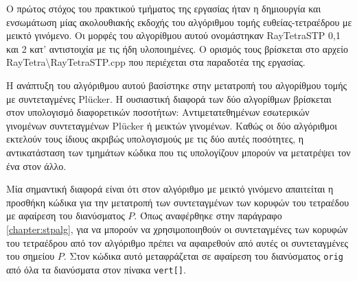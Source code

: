 \noindent Ο πρώτος στόχος του πρακτικού τμήματος της εργασίας ήταν η δημιουργία και ενσωμάτωση μίας ακολουθιακής εκδοχής του αλγόριθμου τομής ευθείας-τετραέδρου με μεικτό γινόμενο. Οι μορφές του αλγορίθμου αυτού ονομάστηκαν RayTetraSTP 0,1 και 2 κατ' αντιστοιχία με τις ήδη υλοποιημένες. Ο ορισμός τους βρίσκεται στο αρχείο RayTetra\textbackslash RayTetraSTP.cpp που περιέχεται στα παραδοτέα της εργασίας.

Η ανάπτυξη του αλγόριθμου αυτού βασίστηκε στην μετατροπή του αλγορίθμου τομής με συντεταγμένες Plücker. Η ουσιαστική διαφορά των δύο αλγορίθμων βρίσκεται στον υπολογισμό διαφορετικών ποσοτήτων: Αντιμετατεθημένων εσωτερικών γινομένων συντεταγμένων Plücker ή μεικτών γινομένων. Καθώς οι δύο αλγόριθμοι εκτελούν τους ίδιους ακριβώς υπολογισμούς με τις δύο αυτές ποσότητες, η αντικατάσταση των τμημάτων κώδικα που τις υπολογίζουν μπορούν να μετατρέψει τον ένα στον άλλο. 

Μία σημαντική διαφορά είναι ότι στον αλγόριθμο με μεικτό γινόμενο απαιτείται η προσθήκη κώδικα για την μετατροπή των συντεταγμένων των κορυφών του τετραέδου με αφαίρεση του διανύσματος $P$. Όπως αναφέρθηκε στην παράγραφο \ref{chapter:stpalg}, για να μπορούν να χρησιμοποιηθούν οι συντεταγμένες των κορυφών του τετραέδρου από τον αλγόριθμο πρέπει να αφαιρεθούν από αυτές οι συντεταγμένες του σημείου $P$. Στον κώδικα αυτό μεταφράζεται σε αφαίρεση του διανύσματος \verb!orig! από όλα τα διανύσματα στον πίνακα \verb!vert[]!. 

